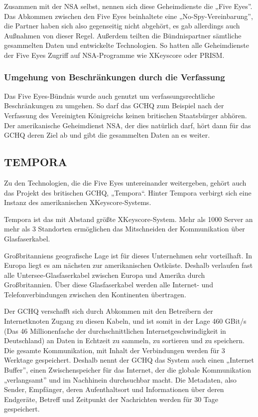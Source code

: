 \documentclass[12pt,a4paper]{scrartcl}
\begin{document}
Zusammen mit der NSA selbst, nennen sich diese Geheimdienste die „Five Eyes”.\cite{wiki_ukusa}
Das Abkommen zwischen den Five Eyes beinhaltete eine „No-Spy-Vereinbarung”, die Partner haben sich also gegenseitig nicht abgehört, es gab allerdings auch Außnahmen von dieser Regel. Außerdem teilten die Bündnispartner sämtliche gesammelten Daten und entwickelte Technologien.\cite{wiki_ukusa} So hatten alle Geheimdienste der Five Eyes Zugriff auf NSA-Programme wie XKeyscore oder PRISM.\cite{wiki_ukusa}

\subsubsection{Umgehung von Beschränkungen durch die Verfassung}
Das Five Eyes-Bündnis wurde auch genutzt um verfassungsrechtliche Beschränkungen zu umgehen. So darf das GCHQ zum Beispiel nach der Verfassung des Vereinigten Königreichs keinen britischen Staatsbürger abhören. Der amerikanische Geheimdienst NSA, der dies natürlich darf, hört dann für das GCHQ deren Ziel ab und gibt die gesammelten Daten an es weiter.\cite{guardian_intentionalspy}

\subsection{TEMPORA}
Zu den Technologien, die die Five Eyes untereinander weitergeben, gehört auch das Projekt des britischen GCHQ, „Tempora“. Hinter Tempora verbirgt sich eine Instanz des amerikanischen XKeyscore-Systems.\cite{gchq_tempora}

Tempora ist das mit Abstand größte XKeyscore-System. Mehr als 1000 Server an mehr als 3 Standorten ermöglichen das Mitschneiden der Kommunikation über Glasfaserkabel.\cite{gchq_tempora}

Großbritanniens geografische Lage ist für dieses Unternehmen sehr vorteilhaft. In Europa liegt es am nächsten zur amerikanischen Ostküste. Deshalb verlaufen fast alle Untersee-Glasfaserkabel zwischen Europa und Amerika durch Großbritannien. Über diese Glasfaserkabel werden alle Internet- und Telefonverbindungen zwischen den Kontinenten übertragen.\cite{gchq_tempora}

Der GCHQ verschafft sich durch Abkommen mit den Betreibern der Internetknoten Zugang zu diesen Kabeln, und ist somit in der Lage 460 GBit/s\cite{gchq_tempora} (Das 46 Millionenfache der durchschnittlichen Internetgeschwindigkeit in Deutschland\cite{statista_internet}) an Daten in Echtzeit zu sammeln, zu sortieren und zu speichern. Die gesamte Kommunikation, mit Inhalt der Verbindungen werden für 3 Werktage gespeichert. Deshalb nennt der GCHQ das System auch einen „Internet Buffer”, einen Zwischenspeicher für das Internet, der die globale Kommunikation „verlangsamt” und im Nachhinein durchsuchbar macht.\cite{gchq_tempora} Die Metadaten, also Sender, Empfänger, deren Aufenthaltsort und Informationen über deren Endgeräte, Betreff und Zeitpunkt der Nachrichten werden für 30 Tage gespeichert.\cite{gchq_tempora}
\end{document}
